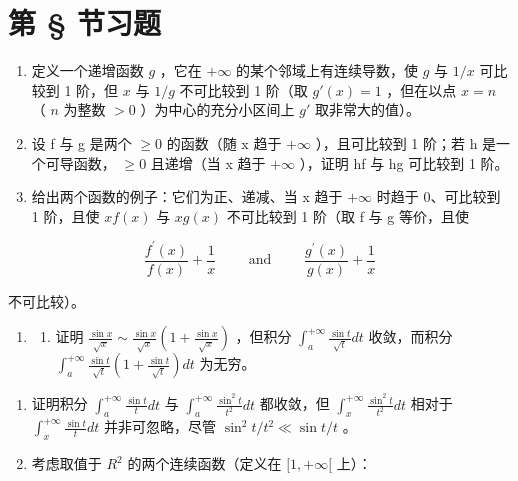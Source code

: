 \section*{第 \S{} 节习题}
{}

\begin{enumerate}
\def\labelenumi{\arabic{enumi})}
\item
  定义一个递增函数 \(g\) ，它在 \(+\infty\) 的某个邻域上有连续导数，使 \(g\) 与 \(1 / x\) 可比较到 1 阶，但 \(x\) 与 \(1 / g\) 不可比较到 1 阶（取 \(g'(x) = 1\) ，但在以点 \(x = n\) （ \(n\) 为整数 \(>0\) ）为中心的充分小区间上 \(g'\) 取非常大的值）。
\item
  设 f 与 g 是两个 \(\geqslant0\) 的函数（随 x 趋于 \(+\infty\) ），且可比较到 1 阶；若 h 是一个可导函数， \(\geqslant0\) 且递增（当 x 趋于 \(+\infty\) ），证明 hf 与 hg 可比较到 1 阶。
\item
  给出两个函数的例子：它们为正、递减、当 x 趋于 \(+\infty\) 时趋于 0、可比较到 1 阶，且使 \(xf(x)\) 与 \(xg(x)\) 不可比较到 1 阶（取 f 与 g 等价，且使
\end{enumerate}

\[
\frac {f ^ {\prime} (x)}{f (x)} + \frac {1}{x} \qquad \text { and } \qquad \frac {g ^ {\prime} (x)}{g (x)} + \frac {1}{x}
\]

不可比较）。

\begin{enumerate}
\def\labelenumi{\arabic{enumi})}
\setcounter{enumi}{3}
\tightlist
\item
  \begin{enumerate}
  \def\labelenumii{\alph{enumii})}
  \tightlist
  \item
    证明 \(\frac{\sin x}{\sqrt{x}} \sim \frac{\sin x}{\sqrt{x}} \left(1 + \frac{\sin x}{\sqrt{x}}\right)\) ，但积分 \(\int_{a}^{+\infty} \frac{\sin t}{\sqrt{t}} dt\) 收敛，而积分 \(\int_{a}^{+\infty} \frac{\sin t}{\sqrt{t}} \left(1 + \frac{\sin t}{\sqrt{t}}\right) dt\) 为无穷。
  \end{enumerate}
\end{enumerate}

\begin{enumerate}
\def\labelenumi{\alph{enumi})}
\setcounter{enumi}{1}
\item
  证明积分 \(\int_{a}^{+\infty}\frac{\sin t}{t}dt\) 与 \(\int_{a}^{+\infty}\frac{\sin^{2}t}{t^{2}}dt\) 都收敛，但 \(\int_{x}^{+\infty}\frac{\sin^{2}t}{t^{2}}dt\) 相对于 \(\int_{x}^{+\infty}\frac{\sin t}{t}dt\) 并非可忽略，尽管 \(\sin^{2}t/t^{2}\ll\sin t/t\) 。
\item
  考虑取值于 \(R^{2}\) 的两个连续函数（定义在 \([1, +\infty[\) 上）：
\end{enumerate}

